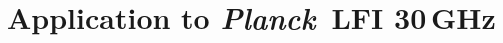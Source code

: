 \documentclass{aa}
\def\Planck{\textit{Planck}}
\begin{document}




\section{Application to \Planck\ LFI 30\,GHz}
\label{sec:lfi}
\end{document}
